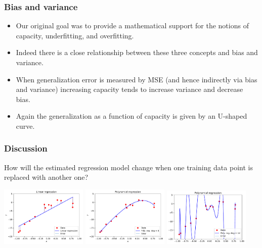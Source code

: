 \documentclass[notes]{beamer}          %
\begin{document}
\begin{frame}
\frametitle{Bias and variance}
    \begin{itemize}
        \item Our original goal was to provide a mathematical support for the notions of capacity, underfitting, and overfitting.
        \item Indeed there is a close relationship between these three concepts and bias and variance.
        \item When generalization error is measured by MSE (and hence indirectly via bias and variance) increasing capacity tends to increase variance and decrease bias.
        \item Again the generalization as a function of capacity is given by an U-shaped curve.
    \end{itemize}
\end{frame}

\begin{frame}
\frametitle{Discussion}
How will the estimated regression model change when one training data point is replaced with another one?
\vfill
  \begin{center}
        \includegraphics[width=0.31\textwidth]{../figures/week_1/linear_regression_error.pdf}
        \includegraphics[width=0.31\textwidth]{../figures/week_1/polynomial_regression_degree_4.pdf}
        \includegraphics[width=0.31\textwidth]{../figures/week_1/polynomial_regression_degree_12.pdf}
    \end{center}
  
\end{frame}
\end{document}
